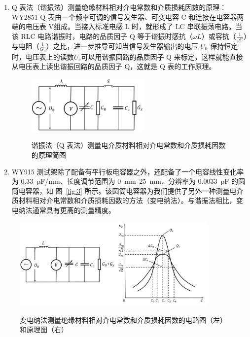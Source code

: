 \documentclass[a4paper,utf8]{article}
\newcommand{\fgref}[1]{图~\ref{#1} }
\newcommand{\qrange}[3]{\qtyrange[range-phrase = \text{$\sim$},range-units =single]{#1}{#2}{#3}}
\begin{document}
        \begin{enumerate}
            \item Q 表法（谐振法）测量绝缘材料相对介电常数和介质损耗因数的原理：WY2851 Q 表由一个频率可调的信号发生器、可变电容 C 和连接在电容器两端的电压表 V组成。当接入标准电感 L 时，就形成了 LC 串联振荡电路。当该 RLC 电路谐振时，电路的品质因子 Q 等于谐振时感抗（$\omega L$）或容抗（$\frac{1}{\omega C}$）与电阻（$\frac{1}{G_0}$）之比，进一步推导可知当信号发生器输出的电压 $U_0$ 保持恒定时，电压表上的读数$U_c$可以用谐振回路的品质因子 Q 来标定，这样就能直接从电压表上读出谐振回路的品质因子 Q，这就是 Q 表的工作原理。\par
                \begin{figure}[!ht]\centering
                    \includegraphics[width=60mm]{fg4.jpg}\
                    \caption{谐振法（Q 表法）测量电介质材料相对介电常数和介质损耗因数的原理简图\label{fig:4}}
                \end{figure}\par
            \item  WY915 测试架除了配备有平行板电容器之外，还配备了一个电容线性变化率为 \SI{0.33}{\pico\farad/\milli\metre}、长度调节范围为 \qrange{0}{25}{\milli\metre}、分辨率为 \SI{0.0033}{\pico\farad} 的圆筒电容器，如 \fgref{fig:3} 所示。该圆筒电容器为我们提供了另外一种测量电介质材料相对介电常数和介质损耗因数的方法（变电纳法）。与谐振法相比，变电纳法通常具有更高的测量精度。

        \end{enumerate}


        \begin{figure}[!ht]\centering
            \includegraphics[width=100mm]{fg5.jpg}\
            \caption{变电纳法测量绝缘材料相对介电常数和介质损耗因数的电路图（左）和原理图（右）\label{fig:5}}
        \end{figure}
\end{document}
